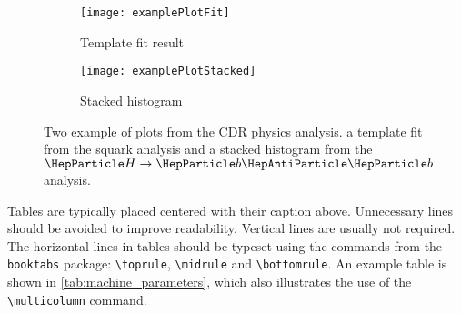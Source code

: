 \begin{figure}
  \centering
  \begin{subfigure}[b]{0.48\textwidth}
    \texttt{[image: examplePlotFit]}
    \caption{Template fit result}
    \label{fig:example_fit}
  \end{subfigure}
  \hfill
  \begin{subfigure}[b]{0.48\textwidth}
    \texttt{[image: examplePlotStacked]}
    \caption{Stacked histogram}
  \label{fig:example_stacked}
  \end{subfigure}
  \caption{Two example of plots from the CDR physics analysis.  a template fit from the squark analysis and  a stacked histogram from the $\PH \to \PQb\PAQb$ analysis.}\label{fig:example_analysis}
\end{figure}
Tables are typically placed centered with their caption above. Unnecessary lines should be avoided to improve readability. Vertical lines are usually not required.
The horizontal lines in tables should be typeset using the commands from the \texttt{booktabs} package: \texttt{\textbackslash toprule}, \texttt{\textbackslash midrule} and \texttt{\textbackslash bottomrule}. An example table is shown in \cref{tab:machine_parameters}, which also illustrates the use of the \texttt{\textbackslash multicolumn} command.

